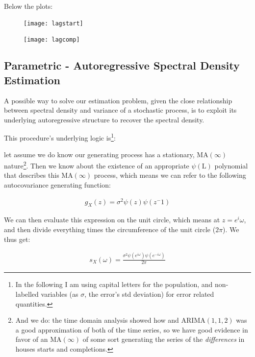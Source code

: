 \documentclass[12pt]{article} %
\begin{document}
Below the plots:

\begin{figure}[H]
\begin{center}
\texttt{[image: lagstart]}
\caption{}
\end{center}
\end{figure}

\begin{figure}[H]
\begin{center}
\texttt{[image: lagcomp]}
\caption{}
\end{center}
\end{figure}


\subsection{Parametric - Autoregressive Spectral Density Estimation}

A possible way to solve our estimation problem, given the close relationship between spectral density and variance of a stochastic process, is to exploit its underlying autoregressive structure to recover the spectral density. 

This procedure's underlying logic is\footnote{In the following I am using capital letters for the population, and non-labelled variables (as $\sigma$, the error's std deviation) for error related quantities.}: 

let assume we do know our generating process has a stationary, $\text{MA}(\infty)$ nature\footnote{
And we do: the time domain analysis showed how and $\text{ARIMA}(1,1,2)$ was a good approximation of both of the time series, so we have good evidence in favor of an $\text{MA}(\infty)$ of some sort generating the series of the {\em differences} in houses starts and completions.}. Then we know about the existence of an appropriate $\psi(\text{L})$ polynomial that describes this $\text{MA}(\infty)$ process, which means we can refer to the following autocovariance generating function:

\begin{equation}
\begin{aligned}
g_X(z)=\sigma^2\psi(z)\psi(z^-1)
\end{aligned}
\end{equation}

We can then evaluate this expression on the unit circle, which means at $z=e^i\omega$, and then divide everything times the circumference of the unit circle ($2\pi$). We thus get:

\begin{equation}
\begin{aligned}
s_X(\omega)=\frac{\sigma^2\psi(e^{i\omega})\psi(e^{-i\omega})}{2\pi}
\end{aligned}
\end{equation}
\end{document}
